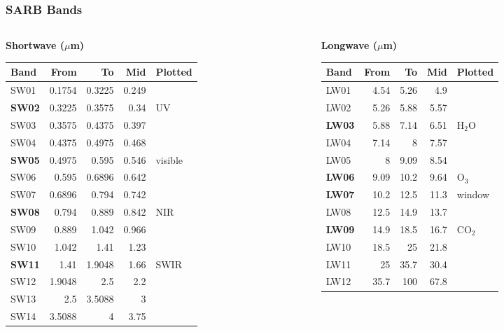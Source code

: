 \begin{frame}[t]
\frametitle{SARB Bands}
\scriptsize
\begin{columns}[T]
\begin{column}{0.49\textwidth}
\centering
\textbf{Shortwave ($\mu$m)}\\[2pt]
\begin{tabular}{@{}lrrrl@{}}
\toprule
Band & From & To & Mid & Plotted \\
\midrule
  SW01 & 0.1754 & 0.3225 & 0.249 &  \\
  \textbf{SW02} & 0.3225 & 0.3575 & 0.34 & UV \\
  SW03 & 0.3575 & 0.4375 & 0.397 &  \\
  SW04 & 0.4375 & 0.4975 & 0.468 &  \\
  \textbf{SW05} & 0.4975 & 0.595 & 0.546 & visible \\
  SW06 & 0.595 & 0.6896 & 0.642 &  \\
  SW07 & 0.6896 & 0.794 & 0.742 &  \\
  \textbf{SW08} & 0.794 & 0.889 & 0.842 & NIR \\
  SW09 & 0.889 & 1.042 & 0.966 &  \\
  SW10 & 1.042 & 1.41 & 1.23 &  \\
  \textbf{SW11} & 1.41 & 1.9048 & 1.66 & SWIR \\
  SW12 & 1.9048 & 2.5 & 2.2 &  \\
  SW13 & 2.5 & 3.5088 & 3 &  \\
  SW14 & 3.5088 & 4 & 3.75 &  \\
\bottomrule
\end{tabular}
\end{column}
\begin{column}{0.49\textwidth}
\centering
\textbf{Longwave ($\mu$m)}\\[2pt]
\begin{tabular}{@{}lrrrl@{}}
\toprule
Band & From & To & Mid & Plotted \\
\midrule
  LW01 & 4.54 & 5.26 & 4.9 &  \\
  LW02 & 5.26 & 5.88 & 5.57 &  \\
  \textbf{LW03} & 5.88 & 7.14 & 6.51 & H$_2$O \\
  LW04 & 7.14 & 8 & 7.57 &  \\
  LW05 & 8 & 9.09 & 8.54 &  \\
  \textbf{LW06} & 9.09 & 10.2 & 9.64 & O$_3$ \\
  \textbf{LW07} & 10.2 & 12.5 & 11.3 & window \\
  LW08 & 12.5 & 14.9 & 13.7 &  \\
  \textbf{LW09} & 14.9 & 18.5 & 16.7 & CO$_2$ \\
  LW10 & 18.5 & 25 & 21.8 &  \\
  LW11 & 25 & 35.7 & 30.4 &  \\
  LW12 & 35.7 & 100 & 67.8 &  \\
\bottomrule
\end{tabular}
\end{column}
\end{columns}
\end{frame}
